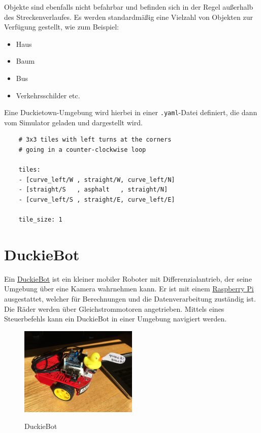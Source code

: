 Objekte sind ebenfalls nicht befahrbar und befinden sich in der Regel außerhalb des Streckenverlaufes. Es werden standardmäßig eine Vielzahl von Objekten zur Verfügung gestellt, wie zum Beispiel:

\newpage

\begin{itemize}
	\item Haus
	\item Baum
	\item Bus
	\item Verkehrsschilder etc.
\end{itemize}

Eine Duckietown-Umgebung wird hierbei in einer \texttt{.yaml}-Datei definiert, die dann vom Simulator geladen und dargestellt wird.

\begin{lstlisting}
	# 3x3 tiles with left turns at the corners
	# going in a counter-clockwise loop
	
	tiles:
	- [curve_left/W , straight/W, curve_left/N]
	- [straight/S   , asphalt   , straight/N]
	- [curve_left/S , straight/E, curve_left/E]
	
	tile_size: 1
\end{lstlisting}

\section{DuckieBot}

Ein \href{https://get.duckietown.com/products/duckiebot-db18}{DuckieBot} ist ein kleiner mobiler Roboter mit Differenzialantrieb, der seine Umgebung über eine Kamera wahrnehmen kann. Er ist mit einem \href{https://www.raspberrypi.org/}{Raspberry Pi} ausgestattet, welcher für Berechnungen und die Datenverarbeitung zuständig ist. Die  Räder werden über Gleichstrommotoren angetrieben. Mittels eines Steuerbefehls kann ein DuckieBot in einer Umgebung navigiert werden. \cite{duckietown_platform}

\begin{figure}[H]
	\centering
	\includegraphics[width=0.5\textwidth]{kapitel2/images/duckiebot.jpg}
	\label{fig:duckiebot}
	\caption{DuckieBot}
\end{figure}


